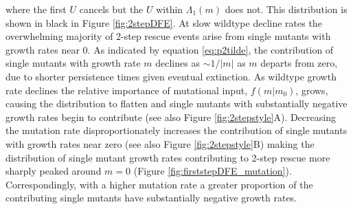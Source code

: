 \documentclass[9pt,twocolumn,twoside,lineno]{gsajnl}
\begin{document}
\noindent where the first $U$ cancels but the $U$ within $\Lambda_{1}(m)$ does not.
This distribution is shown in black in Figure \ref{fig:2stepDFE}.
At slow wildtype decline rates the overwhelming majority of 2-step rescue events arise from single mutants with growth rates near 0.
As indicated by equation \ref{eq:p2tilde}, the contribution of single mutants with growth rate $m$ declines as $\sim1/|m|$ as $m$ departs from zero, due to shorter persistence times given eventual extinction.
As wildtype growth rate declines the relative importance of mutational input, $f(m|m_0)$, grows, causing the distribution to flatten and single mutants with substantially negative growth rates begin to contribute (see also Figure \ref{fig:2stepstyle}A).
Decreasing the mutation rate disproportionately increases the contribution of single mutants with growth rates near zero (see also Figure \ref{fig:2stepstyle}B) making the distribution of single mutant growth rates contributing to 2-step rescue more sharply peaked around $m=0$ (Figure \ref{fig:firststepDFE_mutation}).
Correspondingly, with a higher mutation rate a greater proportion of the contributing single mutants have substantially negative growth rates.
\end{document}
